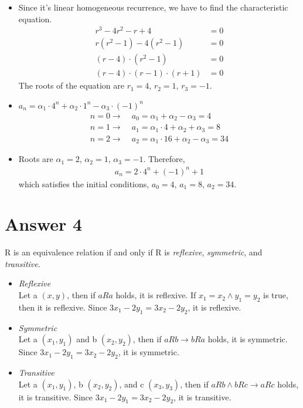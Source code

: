 \documentclass[12pt]{article}
\begin{document}
    \begin{itemize}
        \item Since it's linear homogeneous recurrence, we have to find the characteristic equation.
            \begin{align*}
                r^3 - 4r^2 - r + 4 &= 0 \\
                r (r^2 - 1) - 4(r^2 - 1) &= 0 \\
                (r - 4) \cdot (r^2 - 1) &= 0 \\
                (r - 4) \cdot (r - 1) \cdot (r + 1) &= 0
            \end{align*}
            The roots of the equation are $r_1 = 4$, $r_2 = 1$, $r_3 = -1$.
        
        \item $a_n = \alpha_1 \cdot 4^n + \alpha_2 \cdot 1^n - \alpha_3 \cdot (-1)^n$
            \begin{align*}
                n = 0 \rightarrow & \; a_0 = \alpha_1 + \alpha_2 - \alpha_3 = 4 \\
                n = 1 \rightarrow & \; a_1 = \alpha_1 \cdot 4 + \alpha_2 + \alpha_3 = 8 \\
                n = 2 \rightarrow & \; a_2 = \alpha_1 \cdot 16 + \alpha_2 - \alpha_3 = 34
            \end{align*}
            
        \item Roots are $\alpha_1 = 2$, $\alpha_2 = 1$, $\alpha_3 = -1$. Therefore,
            \begin{align*}
                a_n = 2 \cdot 4^n + (-1)^n + 1
            \end{align*}
            which satisfies the initial conditions, $a_0 = 4$, $a_1 = 8$, $a_2 = 34$.
    \end{itemize}{}

\section*{Answer 4}
    \noindent R is an equivalence relation if and only if R is \textit{reflexive}, \textit{symmetric}, and \textit{transitive}.
    
    \begin{itemize}
        \item \textit{Reflexive} \\
            Let a $(x, y)$, then if $a R a$ holds, it is reflexive. If $x_1 = x_2 \land y_1 = y_2$ is true, then it is reflexive. Since $3x_1 - 2y_1 = 3x_2 - 2y_2$, it is reflexive.
            
        \item \textit{Symmetric} \\
            Let a $(x_1, y_1)$ and b $(x_2, y_2)$, then if $a R b \rightarrow b R a$ holds, it is symmetric. Since $3x_1 - 2y_1 = 3x_2 - 2y_2$, it is symmetric.
            
        \item \textit{Transitive} \\
            Let a $(x_1, y_1)$, b $(x_2, y_2)$, and c $(x_3, y_3)$, then if $a R b \land b R c \rightarrow a R c$ holds, it is transitive. Since $3x_1 - 2y_1 = 3x_2 - 2y_2$, it is transitive.
    \end{itemize}{}
\end{document}
